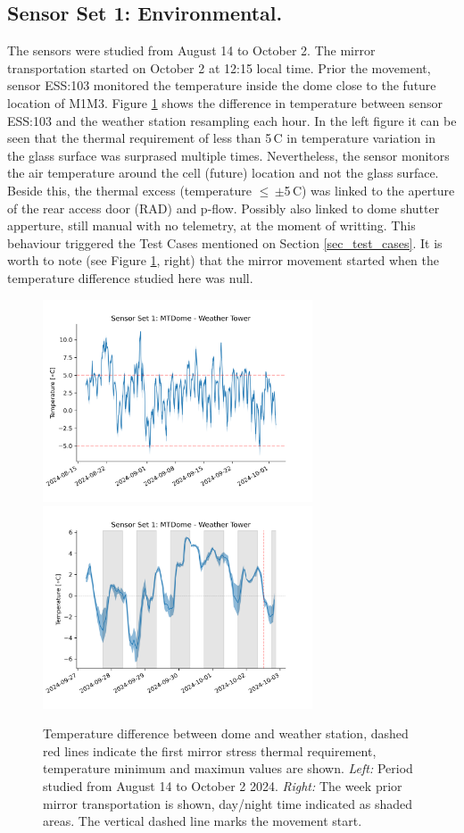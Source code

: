 \documentclass[SE,lsstdraft,authoryear,toc]{lsstdoc}
\begin{document}
\subsection{Sensor Set 1: Environmental.}
The sensors were studied from August 14 to October 2. The mirror transportation started on October 2 at 12:15 local time. Prior the movement, sensor ESS:103 monitored the temperature inside the dome close to the future location of M1M3. Figure \ref{fig_set1_difference} shows the difference in temperature between sensor ESS:103 and the weather station resampling each hour. In the left figure it can be seen that the thermal requirement of less than 5\,\textdegree C in temperature variation in the glass surface was surprased multiple times. Nevertheless, the sensor monitors the air temperature around the cell (future) location and not the glass surface. Beside this, the thermal excess (temperature $\leq$\,$\pm$5\,\textdegree C) was linked to the aperture of the rear access door (RAD) and p-flow. Possibly also linked to dome shutter apperture, still manual with no telemetry, at the moment of writting. This behaviour triggered the Test Cases mentioned on Section \ref{sec_test_cases}. It is worth to note (see Figure \ref{fig_set1_difference}, right) that the mirror movement started when the temperature difference studied here was null.

\begin{figure}[h!]
  \includegraphics[width=8cm]{SITCOMTN-141_figures/Sensor1_1h_delta_temp.png}
  \includegraphics[width=8cm]{SITCOMTN-141_figures/Sensor1_1h_delta_temp_moment.png}
  \caption{Temperature difference between dome and weather station, dashed red lines indicate the first mirror stress thermal requirement, temperature minimum and maximun values are shown. \textit{Left:} Period studied from August 14 to October 2 2024. \textit{Right:} The week prior mirror transportation is shown, day/night time indicated as shaded areas. The vertical dashed line marks the movement start.}
  \label{fig_set1_difference}
\end{figure}
\end{document}
